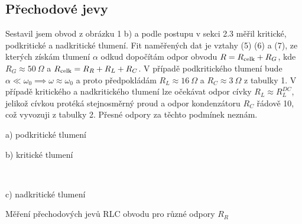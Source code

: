 \documentclass[a4paper,11pt]{article}
\begin{document}
\subsection{Přechodové jevy}

Sestavil jsem obvod z obrázku 1 b) a podle postupu v sekci 2.3 měřil kritické, podkritické a nadkritické tlumení. Fit naměřených dat je vztahy (5) (6) a (7), ze kterých získám tlumení $ \alpha $ odkud dopočítám odpor obvodu $ R = R_{\rm celk} + R_G $, kde $ R_G \approx 50\ \Omega $ a $ R_{\rm celk} = R_R + R_L + R_C $. V případě podkritického tlumení bude $ \alpha \ll \omega_0 \implies \omega \approx \omega_0 $ a proto předpokládám $ R_L \approx 16\ \Omega $ a $ R_C \approx 3\ \Omega $ z tabulky 1. V případě kritického a nadkritického tlumení lze očekávat odpor cívky $ R_L \approx R_{L}^{DC} $, jelikož cívkou protéká stejnosměrný proud a odpor kondenzátoru $ R_C $ řádově 10, což vyvozuji z tabulky 2. Přesné odpory za těchto podmínek neznám.

\begin{table}[htpb]
    \hfill
    \begin{minipage}[b]{.4\linewidth}
        \centering
        \captionsetup{labelformat=empty}
        \caption{a) podkritické tlumení}
        \vspace{-10pt}
        \resizebox{\textwidth}{!}{  }
    \end{minipage} 
    \hfill
    \begin{minipage}[b]{.4\linewidth}
        \centering
        \captionsetup{labelformat=empty}
        \caption{b) kritické tlumení}
        \vspace{-10pt}
        \resizebox{\textwidth}{!}{  } \\
    \end{minipage} 
    \hfill
\end{table}
\vspace{-25pt}

\begin{table}[htpb]
    \hfill
    \begin{minipage}[b]{.4\linewidth}
        \centering
        \captionsetup{labelformat=empty}
        \caption{c) nadkritické tlumení}
        \vspace{-10pt}
        \resizebox{\textwidth}{!}{  }
    \end{minipage} 
    \hfill
    \captionsetup{type=graph}
    \vspace{20pt}
    \caption{Měření přechodových jevů RLC obvodu pro různé odpory $ R_R $}
\end{table}
\end{document}
